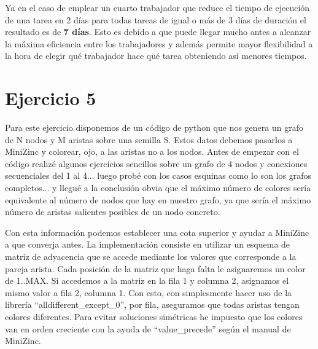 \documentclass[12pt,letterpaper]{article}
\numberwithin{equation}{section} %
\numberwithin{figure}{section} %
\numberwithin{table}{section} %
\begin{document}
Ya en el caso de emplear un cuarto trabajador que reduce el tiempo de ejecución de una tarea
en 2 días para todas tareas de igual o más de 3 días de duración el resultado es de \textbf{7 días}.
Esto es debido a que puede llegar mucho antes a alcanzar la máxima eficiencia entre los trabajadores
y además permite mayor flexibilidad a la hora de elegir qué trabajador hace qué tarea obteniendo así
menores tiempos.

\section{Ejercicio 5}
Para este ejercicio disponemos de un código de python que nos genera un grafo de N nodos y M aristas sobre
una semilla S. Estos datos debemos pasarlos a MiniZinc y colorear, ojo, a las aristas no a los nodos.
Antes de empezar con el código realizé algunos ejercicios sencillos sobre un grafo de 4 nodos y conexiones
secuenciales del 1 al 4... luego probé con los casos esquinas como lo son los grafos completos... y llegué a la
conclusión obvia que el máximo número de colores sería equivalente al número de nodos que hay en nuestro grafo,
ya que sería el máximo número de aristas salientes posibles de un nodo concreto.
\par
Con esta información podemos establecer una cota superior y ayudar a MiniZinc a que converja antes. La implementación
consiste en utilizar un esquema de matriz de adyacencia que se accede mediante los valores que corresponde a la pareja
arista. Cada posición de la matriz que haga falta le asignaremos un color de 1..MAX. Si accedemos a la matriz en la
fila 1 y columna 2, asignamos el mismo valor a fila 2, columna 1. Con esto, con simplesmente hacer uso de la librería
``alldifferent\_except\_0'', por fila,  aseguramos que todas aristas tengan colores diferentes.
Para evitar soluciones simétricas he impuesto que los colores van en orden creciente con
la ayuda de ``value\_precede'' según el manual de MiniZinc.
\end{document}
